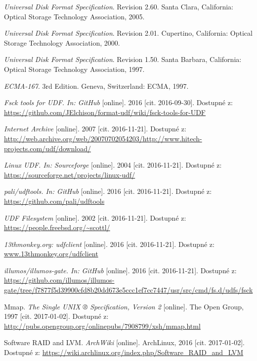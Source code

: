 \begin{literatura}{99}
	
    \emph{Universal Disk Format Specification}. Revision 2.60. Santa Clara, California: Optical Storage Technology Association, 2005.

    \emph{Universal Disk Format Specification}. Revision 2.01. Cupertino, California: Optical Storage Technology Association, 2000.

    \emph{Universal Disk Format Specification}. Revision 1.50. Santa Barbara, California: Optical Storage Technology Association, 1997.

    \emph{ECMA-167}. 3rd Edition. Geneva, Switzerland: ECMA, 1997.

    \emph{Fsck tools for UDF. In: GitHub}\/ [online]. 2016 [cit. 2016-09-30]. Dostupné z: \url{https://github.com/JElchison/format-udf/wiki/fsck-tools-for-UDF}

    \emph{Internet Archive}\/ [online]. 2007 [cit. 2016-11-21]. Dostupné z: \url{http://web.archive.org/web/20070702054203/http://www.hitech-projects.com/udf/download/}

    \emph{Linux UDF. In: Sourceforge}\/ [online]. 2004 [cit. 2016-11-21]. Dostupné z: \url{https://sourceforge.net/projects/linux-udf/}

    \emph{pali/udftools. In: GitHub}\/ [online]. 2016 [cit. 2016-11-21]. Dostupné z: \url{https://github.com/pali/udftools}

    \emph{UDF Filesystem}\/ [online]. 2002 [cit. 2016-11-21]. Dostupné z: \url{https://people.freebsd.org/~scottl/}

    \emph{13thmonkey.org: udfclient}\/ [online]. 2016 [cit. 2016-11-21]. Dostupné z: \url{www.13thmonkey.org/udfclient}  

    \emph{illumos/illumos-gate. In: GitHub}\/ [online]. 2016 [cit. 2016-11-21]. Dostupné z: \url{https://github.com/illumos/illumos-gate/tree/f7877f5d39900cfd8b20dd673e5ccc1ef7cc7447/usr/src/cmd/fs.d/udfs/fsck} 

    Mmap. \emph{The Single UNIX ® Specification, Version 2} [online]. The Open Group, 1997 [cit. 2017-01-02]. Dostupné z: \url{http://pubs.opengroup.org/onlinepubs/7908799/xsh/mmap.html}

    Software RAID and LVM. \emph{ArchWiki} [online]. ArchLinux, 2016 [cit. 2017-01-02]. Dostupné z: \url{https://wiki.archlinux.org/index.php/Software_RAID_and_LVM}


\end{literatura}
